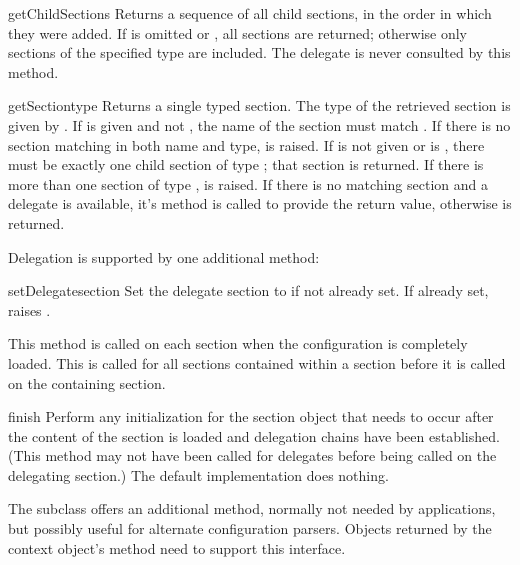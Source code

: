 \documentclass{howto}
\begin{document}
\begin{methoddesc}[Configuration]{getChildSections}{}
  Returns a sequence of all child sections, in the order in which they
  were added.  If  is omitted or , all sections
  are returned; otherwise only sections of the specified type are
  included.  The delegate is never consulted by this method.
\end{methoddesc}

\begin{methoddesc}[Configuration]{getSection}{type}
  Returns a single typed section.  The type of the retrieved section
  is given by .  If  is given and not ,
  the name of the section must match .  If there is no
  section matching in both name and type,
   is
  raised.  If  is not given or is , there must be
  exactly one child section of type ; that section is
  returned.  If there is more than one section of type ,
   is raised.  If
  there is no matching section and a delegate is available, it's
   method is called to provide the return value,
  otherwise  is returned.
\end{methoddesc}

Delegation is supported by one additional method:

\begin{methoddesc}[Configuration]{setDelegate}{section}
  Set the delegate section to  if not already set.  If
  already set, raises .
\end{methoddesc}

This method is called on each section when the configuration is
completely loaded.  This is called for all sections contained within a
section before it is called on the containing section.

\begin{methoddesc}[Configuration]{finish}{}
  Perform any initialization for the section object that needs to
  occur after the content of the section is loaded and delegation
  chains have been established.  (This method may not have been called
  for delegates before being called on the delegating section.)  The
  default implementation does nothing.
\end{methoddesc}

The  subclass offers an additional
method, normally not needed by applications, but possibly useful for
alternate configuration parsers.  Objects returned by the
context object's  method need to
support this interface.
\end{document}
